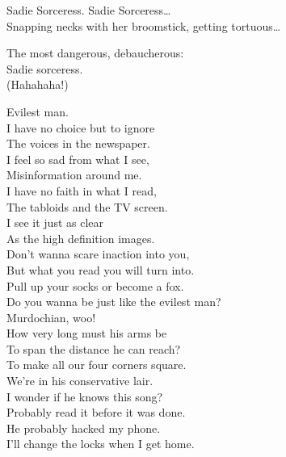 
Sadie Sorceress. Sadie Sorceress… \\
Snapping necks with her broomstick, getting tortuous… \\


The most dangerous, debaucherous: \\
Sadie sorceress. \\
(Hahahaha!) \\





Evilest man. \\

I have no choice but to ignore \\
The voices in the newspaper. \\
I feel so sad from what I see, \\
Misinformation around me. \\

I have no faith in what I read, \\
The tabloids and the TV screen. \\
I see it just as clear \\
As the high definition images. \\

Don't wanna scare inaction into you, \\
But what you read you will turn into. \\
Pull up your socks or become a fox. \\
Do you wanna be just like the evilest man? \\
Murdochian, woo! \\

How very long must his arms be \\
To span the distance he can reach? \\
To make all our four corners square. \\
We're in his conservative lair. \\

I wonder if he knows this song? \\
Probably read it before it was done. \\
He probably hacked my phone. \\
I'll change the locks when I get home. \\

